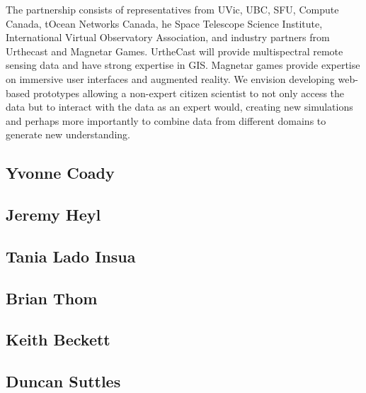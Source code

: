 The partnership consists of representatives from UVic, UBC, SFU,
Compute Canada, tOcean Networks Canada, he Space Telescope Science
Institute, International Virtual Observatory Association, and industry
partners from Urthecast and Magnetar Games.  UrtheCast will provide
multispectral remote sensing data and have strong expertise in GIS.
Magnetar games provide expertise on immersive user interfaces and
augmented reality.  We envision developing web-based prototypes
allowing a non-expert citizen scientist to not only access the data
but to interact with the data as an expert would, creating new
simulations and perhaps more importantly to combine data from
different domains to generate new understanding.

\subsection*{Yvonne Coady}
\subsection*{Jeremy Heyl}
\subsection*{Tania Lado Insua}
\subsection*{Brian Thom}
\subsection*{Keith Beckett}
\subsection*{Duncan Suttles}
